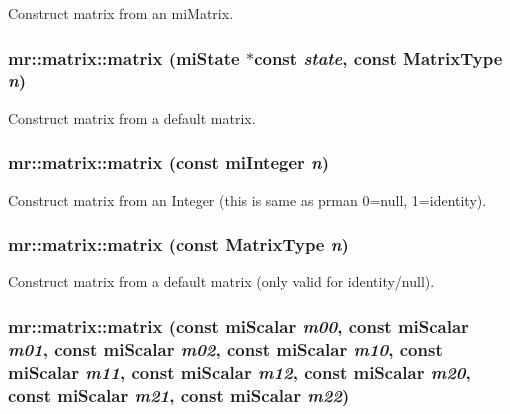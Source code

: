 Construct matrix from an mi\-Matrix. 

\subsubsection{\setlength{\rightskip}{0pt plus 5cm}mr::matrix::matrix (mi\-State $\ast$const {\em state}, const {\bf Matrix\-Type} {\em n})\hspace{0.3cm}{\tt  [inline]}}\label{classmr_1_1matrix_z19_3}


Construct matrix from a default matrix. 

\subsubsection{\setlength{\rightskip}{0pt plus 5cm}mr::matrix::matrix (const mi\-Integer {\em n})\hspace{0.3cm}{\tt  [inline]}}\label{classmr_1_1matrix_z19_4}


Construct matrix from an Integer (this is same as prman 0=null, 1=identity). 

\subsubsection{\setlength{\rightskip}{0pt plus 5cm}mr::matrix::matrix (const {\bf Matrix\-Type} {\em n})\hspace{0.3cm}{\tt  [inline]}}\label{classmr_1_1matrix_z19_5}


Construct matrix from a default matrix (only valid for identity/null). 

\subsubsection{\setlength{\rightskip}{0pt plus 5cm}mr::matrix::matrix (const mi\-Scalar {\em m00}, const mi\-Scalar {\em m01}, const mi\-Scalar {\em m02}, const mi\-Scalar {\em m10}, const mi\-Scalar {\em m11}, const mi\-Scalar {\em m12}, const mi\-Scalar {\em m20}, const mi\-Scalar {\em m21}, const mi\-Scalar {\em m22})\hspace{0.3cm}{\tt  [inline]}}\label{classmr_1_1matrix_z19_6}


